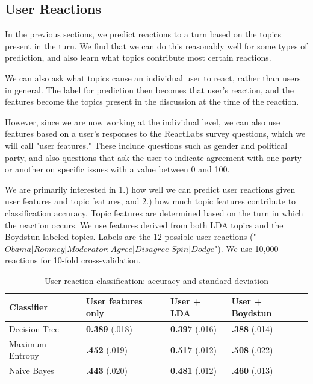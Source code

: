 \subsection{User Reactions}

In the previous sections, we predict reactions to a turn based on the topics present in the turn. We find that we can do this reasonably well for some types of prediction, and also learn what topics contribute most certain reactions.

We can also ask what topics cause an individual user to react, rather than users in general. The label for prediction then becomes that user's reaction, and the features become the topics present in the discussion at the time of the reaction.

However, since we are now working at the individual level, we can also use features based on a user's responses to the ReactLabs survey questions, which we will call "user features." These include questions such as gender and political party, and also questions that ask the user to indicate agreement with one party or another on specific issues with a value between 0 and 100.

We are primarily interested in 1.) how well we can predict user reactions given user features and topic features, and 2.) how much topic features contribute to classification accuracy. Topic features are determined based on the turn in which the reaction occurs. We use features derived from both LDA topics and the Boydstun labeled topics. Labels are the 12 possible user reactions ("$Obama|Romney|Moderator : Agree|Disagree|Spin|Dodge$"). We use 10,000 reactions for 10-fold cross-validation.

\begin{table}[H]
\begin{centering}
\begin{tabular}{ l | l | l | l }
Classifier & User features only & User + LDA & User + Boydstun \\
\hline
Decision Tree & \textbf{0.389} (.018) & \textbf{0.397} (.016) &  \textbf{.388} (.014) \\
Maximum Entropy & \textbf{.452} (.019) & \textbf{0.517} (.012) &  \textbf{.508} (.022) \\
Naive Bayes & \textbf{.443} (.020) & \textbf{0.481} (.012) &  \textbf{.460} (.013) \\
\end{tabular}
\caption{User reaction classification: accuracy and standard deviation}
\end{centering}
\end{table}


